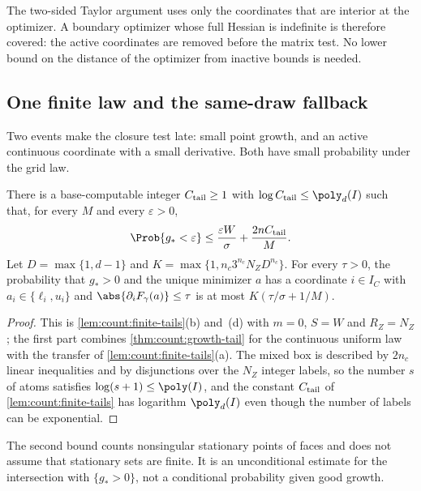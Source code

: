 The two-sided Taylor argument uses only the coordinates that are interior
at the optimizer. A boundary optimizer whose full Hessian is indefinite is
therefore covered: the active coordinates are removed before the matrix
test. No lower bound on the distance of the optimizer from inactive bounds
is needed.

\subsection{One finite law and the same-draw fallback}\label{sec:sp:law}

Two events make the closure test late: small point growth, and an active
continuous coordinate with a small derivative. Both have small probability
under the grid law.

\begin{lemma}\label{lem:sp:tails}
There is a base-computable integer $C_{\rm tail}\ge1$ with
$\log C_{\rm tail}\le\poly_d(I)$ such that, for every $M$ and every
$\varepsilon>0$,
\begin{equation}\label{eq:sp:growthtail}
 \Prob\{g_*<\varepsilon\}\le\frac{\varepsilon W}{\sigma}+\frac{2nC_{\rm tail}}M .
\end{equation}
Let $D=\max\{1,d-1\}$ and $K=\max\{1,n_c3^{n_c}N_ZD^{n_c}\}$. For every
$\tau>0$, the probability that $g_*>0$ and the unique minimizer $a$ has a
coordinate $i\in I_C$ with $a_i\in\{\ell_i,u_i\}$ and
$\abs{\partial_iF_\gamma(a)}\le\tau$ is at most $K(\tau/\sigma+1/M)$.
\end{lemma}

\begin{proof}
This is \cref{lem:count:finite-tails}(b) and~(d) with $m=0$, $S=W$ and
$R_Z=N_Z$; the first part combines \cref{thm:count:growth-tail} for the
continuous uniform law with the transfer of
\cref{lem:count:finite-tails}(a). The mixed box is described by $2n_c$
linear inequalities and by disjunctions over the $N_Z$ integer labels, so
the number $s$ of atoms satisfies $\log(s+1)\le\poly(I)$, and the constant
$C_{\rm tail}$ of \cref{lem:count:finite-tails} has logarithm $\poly_d(I)$
even though the number of labels can be exponential.
\end{proof}

The second bound counts nonsingular stationary points of faces and does not
assume that stationary sets are finite. It is an unconditional estimate for
the intersection with $\{g_*>0\}$, not a conditional probability given good
growth.

